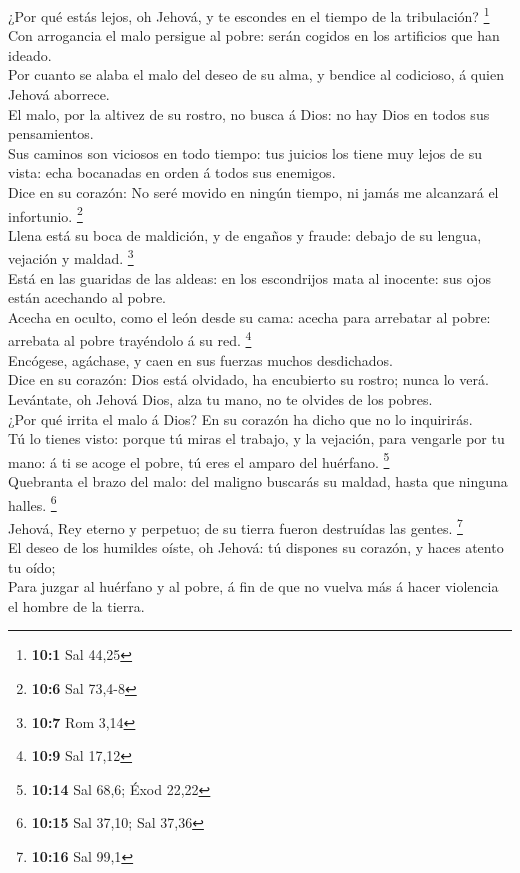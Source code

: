  ¿Por qué estás lejos, oh Jehová, y te escondes en el
tiempo de la tribulación? \footnote{\textbf{10:1} Sal 44,25}\\
 Con arrogancia el malo persigue al pobre: serán cogidos
en los artificios que han ideado.\\
 Por cuanto se alaba el malo del deseo de su alma, y
bendice al codicioso, á quien Jehová aborrece.\\
 El malo, por la altivez de su rostro, no busca á Dios: no
hay Dios en todos sus pensamientos.\\
 Sus caminos son viciosos en todo tiempo: tus juicios los
tiene muy lejos de su vista: echa bocanadas en orden á todos sus
enemigos.\\
 Dice en su corazón: No seré movido en ningún tiempo, ni
jamás me alcanzará el infortunio. \footnote{\textbf{10:6} Sal 73,4-8}\\
 Llena está su boca de maldición, y de engaños y fraude:
debajo de su lengua, vejación y maldad. \footnote{\textbf{10:7} Rom 3,14}\\
 Está en las guaridas de las aldeas: en los escondrijos
mata al inocente: sus ojos están acechando al pobre.\\
 Acecha en oculto, como el león desde su cama: acecha para
arrebatar al pobre: arrebata al pobre trayéndolo á su red. \footnote{\textbf{10:9}
  Sal 17,12}\\
 Encógese, agáchase, y caen en sus fuerzas muchos
desdichados.\\
 Dice en su corazón: Dios está olvidado, ha encubierto su
rostro; nunca lo verá.\\
 Levántate, oh Jehová Dios, alza tu mano, no te olvides
de los pobres.\\
 ¿Por qué irrita el malo á Dios? En su corazón ha dicho
que no lo inquirirás.\\
 Tú lo tienes visto: porque tú miras el trabajo, y la
vejación, para vengarle por tu mano: á ti se acoge el pobre, tú eres el
amparo del huérfano. \footnote{\textbf{10:14} Sal 68,6; Éxod 22,22}\\
 Quebranta el brazo del malo: del maligno buscarás su
maldad, hasta que ninguna halles. \footnote{\textbf{10:15} Sal 37,10;
  Sal 37,36}\\
 Jehová, Rey eterno y perpetuo; de su tierra fueron
destruídas las gentes. \footnote{\textbf{10:16} Sal 99,1}\\
 El deseo de los humildes oíste, oh Jehová: tú dispones
su corazón, y haces atento tu oído;\\
 Para juzgar al huérfano y al pobre, á fin de que no
vuelva más á hacer violencia el hombre de la tierra.

